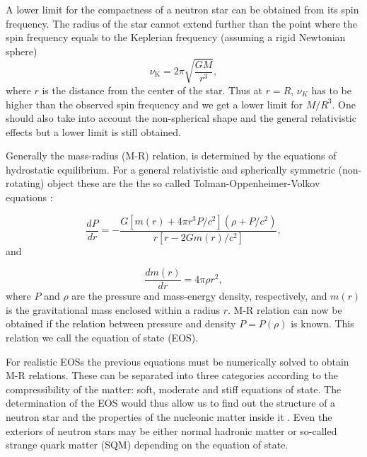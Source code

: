 \documentclass{wihuri}
\def\be{\begin{equation}}
\def\ee{\end{equation}}
\begin{document}
A lower limit for the compactness of a neutron star can be obtained from its spin frequency. The radius of the star cannot extend further than the point where the spin frequency equals to the Keplerian frequency (assuming a rigid Newtonian sphere)
\be \label{eq:keplerian}
\nu_{\mathrm{K}} = 2 \pi \sqrt{\frac{GM}{r^{3}}},
\ee 
where $r$ is the distance from the center of the star. Thus at $r=R$, $\nu_{K}$ has to be higher  than the observed spin frequency and we get a lower limit for $M/R^{3}$. One should also take into account the non-spherical shape and the general relativistic effects but a lower limit is still obtained.








Generally the mass-radius (M-R) relation, is determined by the equations of hydrostatic equilibrium. For a general relativistic and spherically symmetric (non-rotating) object %
these are the the so called Tolman-Oppenheimer-Volkov equations %
\cite{tolman}\cite{oppenheimer}:


\be
 \frac{dP}{dr} = -\frac{G[m(r)+4 \pi r^{3}P/c^{2}](\rho + P/c^{2})}{r[r-2Gm(r)/c^{2}]},
\ee 
and

\be
 \frac{dm(r)}{dr} = 4 \pi \rho r^{2},
\ee
where $P$ and $\rho$ are the pressure and mass-energy density, respectively, and $m(r)$ is the gravitational mass enclosed within a radius $r$. M-R relation can now be obtained if the relation between pressure and density $P=P(\rho)$ is known. This relation we call the equation of state (EOS). 


For realistic EOSs the previous equations must be numerically solved to obtain M-R relations. These can be separated into three categories according to the compressibility of the matter: soft, moderate and stiff equations of state. The determination of the EOS would thus allow us to find out the structure of a neutron star and the properties of the nucleonic matter inside it \cite{akmal}. Even the exteriors of neutron stars may be either normal hadronic matter or so-called strange quark matter (SQM) depending on the equation of state.  
\end{document}
